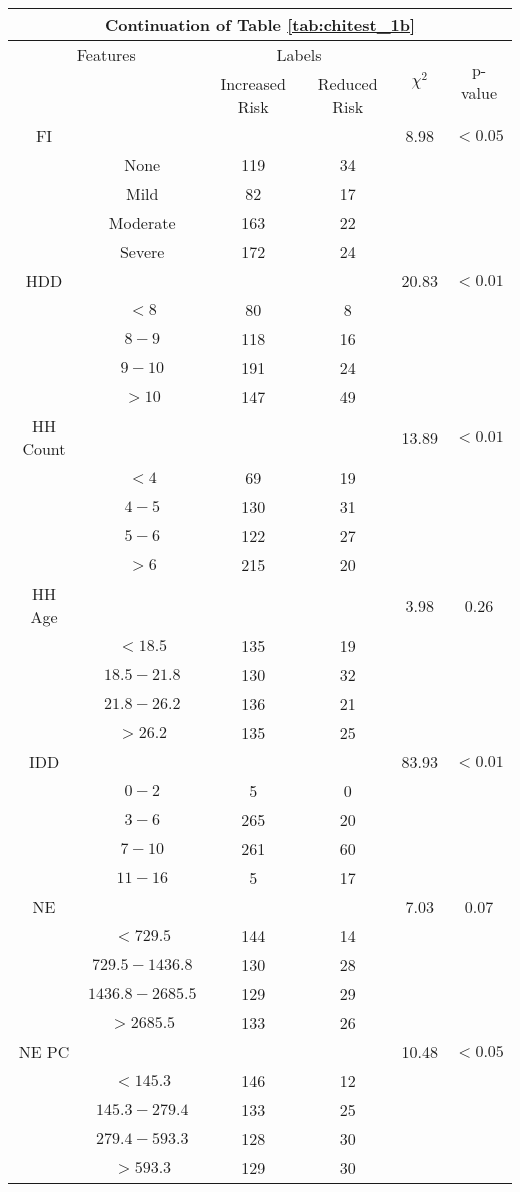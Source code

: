\begin{table}
\centering
\label{tab:chitest_1b_cont}
\begin{tabular}{c c | c c| c | c}
\hline
\multicolumn{6}{c}{Continuation of Table \ref{tab:chitest_1b}}\\ 
\hline
\multicolumn{2}{c|}{Features}& \multicolumn{2}{c|}{Labels}& \multirow{2}{*}{$\chi^2$} & \multirow{2}{*}{p-value}\\ 
& & Increased Risk & Reduced Risk & & \\ 
\hline
FI &  &  & & 8.98 & $< 0.05$ \\ 
& None & 119 & 34& & \\ 
& Mild & 82 & 17& & \\ 
& Moderate & 163 & 22& & \\ 
& Severe & 172 & 24& & \\ 
\hline 
HDD &  &  & & 20.83 & $< 0.01$ \\ 
& $< 8$ & 80 & 8& & \\ 
& $8-9$ & 118 & 16& & \\ 
& $9-10$ & 191 & 24& & \\ 
& $> 10$ & 147 & 49& & \\ 
\hline 
HH Count &  &  & & 13.89 & $< 0.01$ \\ 
& $< 4$ & 69 & 19& & \\ 
& $4-5$ & 130 & 31& & \\ 
& $5-6$ & 122 & 27& & \\ 
& $> 6$ & 215 & 20& & \\ 
\hline 
HH Age &  &  & & 3.98 & 0.26 \\ 
& $< 18.5$ & 135 & 19& & \\ 
& $18.5-21.8$ & 130 & 32& & \\ 
& $21.8-26.2$ & 136 & 21& & \\ 
& $> 26.2$ & 135 & 25& & \\ 
\hline 
IDD &  &  & & 83.93 & $< 0.01$ \\ 
& $0-2$ & 5 & 0& & \\ 
& $3-6$ & 265 & 20& & \\ 
& $7-10$ & 261 & 60& & \\ 
& $11-16$ & 5 & 17& & \\ 
\hline 
NE &  &  & & 7.03 & 0.07 \\ 
& $< 729.5$ & 144 & 14& & \\ 
& $729.5-1436.8$ & 130 & 28& & \\ 
& $1436.8-2685.5$ & 129 & 29& & \\ 
& $> 2685.5$ & 133 & 26& & \\ 
\hline 
NE PC &  &  & & 10.48 & $< 0.05$ \\ 
& $< 145.3$ & 146 & 12& & \\ 
& $145.3-279.4$ & 133 & 25& & \\ 
& $279.4-593.3$ & 128 & 30& & \\ 
& $> 593.3$ & 129 & 30& & \\ 
\hline 
\end{tabular}
\end{table}

